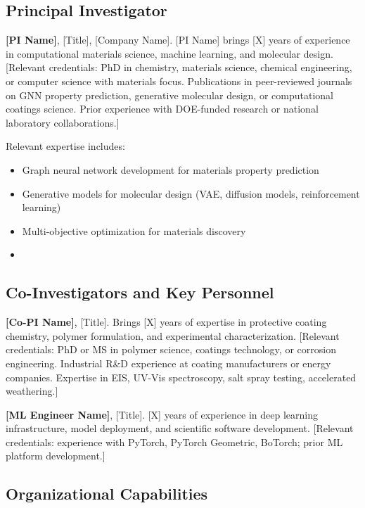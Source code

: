 \documentclass[11pt,letterpaper]{article}
\begin{document}
\subsection{Principal Investigator}

\textbf{[PI Name]}, [Title], [Company Name]. [PI Name] brings [X] years of experience in computational materials science, machine learning, and molecular design. [Relevant credentials: PhD in chemistry, materials science, chemical engineering, or computer science with materials focus. Publications in peer-reviewed journals on GNN property prediction, generative molecular design, or computational coatings science. Prior experience with DOE-funded research or national laboratory collaborations.]

Relevant expertise includes:
\begin{itemize}[noitemsep]
  \item Graph neural network development for materials property prediction
  \item Generative models for molecular design (VAE, diffusion models, reinforcement learning)
  \item Multi-objective optimization for materials discovery
  \item [Specific coating or polymer materials experience]
\end{itemize}

\subsection{Co-Investigators and Key Personnel}

\textbf{[Co-PI Name]}, [Title]. Brings [X] years of expertise in protective coating chemistry, polymer formulation, and experimental characterization. [Relevant credentials: PhD or MS in polymer science, coatings technology, or corrosion engineering. Industrial R\&D experience at coating manufacturers or energy companies. Expertise in EIS, UV-Vis spectroscopy, salt spray testing, accelerated weathering.]

\textbf{[ML Engineer Name]}, [Title]. [X] years of experience in deep learning infrastructure, model deployment, and scientific software development. [Relevant credentials: experience with PyTorch, PyTorch Geometric, BoTorch; prior ML platform development.]

\subsection{Organizational Capabilities}
\end{document}
